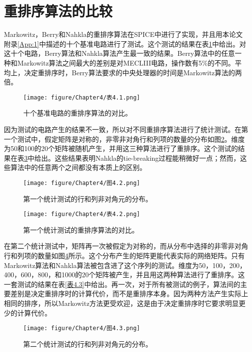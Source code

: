 \section{重排序算法的比较}
Markowitz，Berry和Nahkla的重排序算法在SPICE中进行了实现，并且用本论文附录\ref{App:1}中描述的十个基准电路进行了测试。这个测试的结果在表\ref{表4.1}中给出。对这十个电路，Berry算法和Nahkla算法产生最一致的结果。Berry算法中的任意一种和Markowitz算法之间最大的差别是对MECLIII电路，操作数有5\%的不同。平均上，决定重排序时，Berry算法要求的中央处理器的时间是Markowitz算法的两倍。
\begin{figure}[htbp]
\small
    \centering
    \texttt{[image: figure/Chapter4/表4.1.png]}
    \caption{十个基准电路的重排序算法的对比。}
    \label{表4.1}
\end{figure}
因为测试的电路产生的结果不一致，所以对不同重排序算法进行了统计测试。在第一个测试中，假定矩阵是对称的，非零非对角行和列项的数量的分布如图\ref{图4.2}。维度为50和100的20个矩阵被随机产生，并用这三种算法进行了重排序。这个测试的结果在表\ref{表4.2}中给出。这些结果表明Nahkla的tie-breaking过程能稍微好一点；然而，这些算法中的任意两个之间都没有本质上的区别。
\begin{figure}[htbp]
\small
    \centering
    \texttt{[image: figure/Chapter4/图4.2.png]}
    \caption{第一个统计测试的行和列非对角元的分布。}
    \label{图4.2}
\end{figure}

\begin{figure}[htbp]
\small
    \centering
    \texttt{[image: figure/Chapter4/表4.2.png]}
    \caption{第一个统计测试的重排序算法的对比。}
    \label{表4.2}
\end{figure}

在第二个统计测试中，矩阵再一次被假定为对称的，而从分布中选择的非零非对角行和列项的数量如图\ref{图4.3}所示。这个分布产生的矩阵更能代表实际的网络矩阵。只有Markowitz算法和Nahkla算法被包含进了这个序列的测试。维度为50，100，200，400，600，800，和1000的20个矩阵被产生，并且用这两种算法进行了重排序。这一套测试的结果在表\ref{表4.3}中给出。再一次，对于所有被测试的例子，算法间的主要差别是决定重排序时的计算代价，而不是重排序本身。因为两种方法产生实际上相同的排序，所以Markowitz方法更受欢迎，这是由于决定重排序时它要求明显更少的计算代价。

\begin{figure}[htbp]
\small
    \centering
    \texttt{[image: figure/Chapter4/图4.3.png]}
    \caption{第二个统计测试的行和列非对角元的分布。}
    \label{图4.3}
\end{figure}

